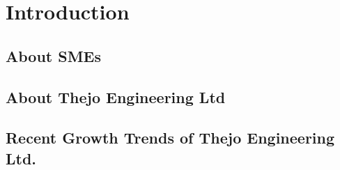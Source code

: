 \section{Introduction}
\label{introchap}


\subsection{About SMEs}


\subsection{About Thejo Engineering Ltd}

\subsection{Recent Growth Trends of Thejo Engineering Ltd. }